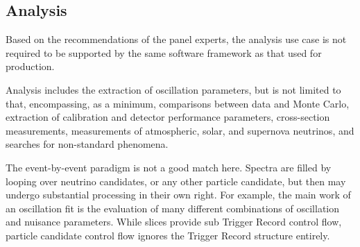 \documentclass[../main-v1.tex]{subfiles}
\begin{document}
\subsection{Analysis}

Based on the recommendations of the  panel experts, the analysis use case is not required to be supported by the same software framework as that used for production.


Analysis includes the extraction of oscillation parameters, but is not limited to that, encompassing, as a minimum, comparisons between data and Monte Carlo, extraction of calibration and detector performance parameters, cross-section measurements, measurements of atmospheric, solar, and supernova neutrinos, and searches for non-standard phenomena.

The event-by-event paradigm is not a good match here. Spectra are filled by looping over neutrino candidates, or any other particle candidate, but then may undergo substantial processing in their own right. For example, the main work of an oscillation fit is the evaluation of many different combinations of oscillation and nuisance parameters.  While slices provide sub Trigger Record control flow, particle candidate control flow ignores the Trigger Record structure entirely.
\end{document}

